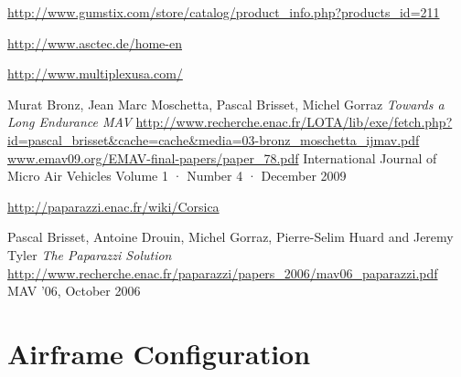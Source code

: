 \documentclass[a4paper,11pt]{report}
\begin{document}
\begin{thebibliography}{9}
  \url{http://www.gumstix.com/store/catalog/product_info.php?products_id=211}

  \url{http://www.asctec.de/home-en}

  \url{http://www.multiplexusa.com/}

  Murat Bronz, Jean Marc Moschetta, Pascal Brisset, Michel Gorraz
  \emph{Towards a Long Endurance MAV}
  \url{http://www.recherche.enac.fr/LOTA/lib/exe/fetch.php?id=pascal_brisset&cache=cache&media=03-bronz_moschetta_ijmav.pdf}
  \url{www.emav09.org/EMAV-final-papers/paper_78.pdf}
  International Journal of Micro Air Vehicles
  Volume 1 · Number 4 · December 2009

  \url{http://paparazzi.enac.fr/wiki/Corsica}

  Pascal Brisset, Antoine Drouin, Michel Gorraz, Pierre-Selim Huard and Jeremy Tyler
  \emph{The Paparazzi Solution}
  \url{http://www.recherche.enac.fr/paparazzi/papers_2006/mav06_paparazzi.pdf}
  MAV '06,
  October 2006

\end{thebibliography}

\appendix
\appendixpage
\addappheadtotoc

\chapter{Airframe Configuration}



\lstset{caption=Airframe Configuration}
\end{document}
